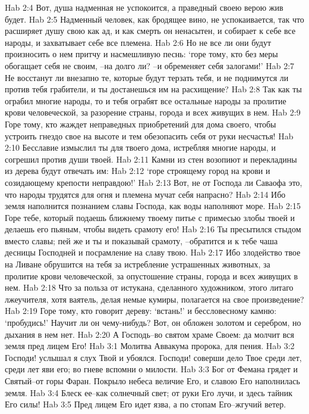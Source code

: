 Hab 2:4  Вот, душа надменная не успокоится, а праведный своею верою жив будет.
Hab 2:5  Надменный человек, как бродящее вино, не успокаивается, так что расширяет душу свою как ад, и как смерть он ненасытен, и собирает к себе все народы, и захватывает себе все племена.
Hab 2:6  Но не все ли они будут произносить о нем притчу и насмешливую песнь: `горе тому, кто без меры обогащает себя не своим, --на долго ли? --и обременяет себя залогами!'
Hab 2:7  Не восстанут ли внезапно те, которые будут терзать тебя, и не поднимутся ли против тебя грабители, и ты достанешься им на расхищение?
Hab 2:8  Так как ты ограбил многие народы, то и тебя ограбят все остальные народы за пролитие крови человеческой, за разорение страны, города и всех живущих в нем.
Hab 2:9  Горе тому, кто жаждет неправедных приобретений для дома своего, чтобы устроить гнездо свое на высоте и тем обезопасить себя от руки несчастья!
Hab 2:10  Бесславие измыслил ты для твоего дома, истребляя многие народы, и согрешил против души твоей.
Hab 2:11  Камни из стен возопиют и перекладины из дерева будут отвечать им:
Hab 2:12  `горе строящему город на крови и созидающему крепости неправдою!'
Hab 2:13  Вот, не от Господа ли Саваофа это, что народы трудятся для огня и племена мучат себя напрасно?
Hab 2:14  Ибо земля наполнится познанием славы Господа, как воды наполняют море.
Hab 2:15  Горе тебе, который подаешь ближнему твоему питье с примесью злобы твоей и делаешь его пьяным, чтобы видеть срамоту его!
Hab 2:16  Ты пресытился стыдом вместо славы; пей же и ты и показывай срамоту, --обратится и к тебе чаша десницы Господней и посрамление на славу твою.
Hab 2:17  Ибо злодейство твое на Ливане обрушится на тебя за истребление устрашенных животных, за пролитие крови человеческой, за опустошение страны, города и всех живущих в нем.
Hab 2:18  Что за польза от истукана, сделанного художником, этого литаго лжеучителя, хотя ваятель, делая немые кумиры, полагается на свое произведение?
Hab 2:19  Горе тому, кто говорит дереву: `встань!' и бессловесному камню: `пробудись!' Научит ли он чему-нибудь? Вот, он обложен золотом и серебром, но дыхания в нем нет.
Hab 2:20  А Господь--во святом храме Своем: да молчит вся земля пред лицем Его!
Hab 3:1  Молитва Аввакума пророка, для пения.
Hab 3:2  Господи! услышал я слух Твой и убоялся. Господи! соверши дело Твое среди лет, среди лет яви его; во гневе вспомни о милости.
Hab 3:3  Бог от Фемана грядет и Святый--от горы Фаран. Покрыло небеса величие Его, и славою Его наполнилась земля.
Hab 3:4  Блеск ее--как солнечный свет; от руки Его лучи, и здесь тайник Его силы!
Hab 3:5  Пред лицем Его идет язва, а по стопам Его--жгучий ветер.
